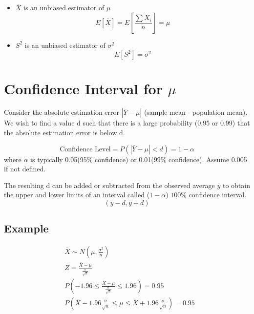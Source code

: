 \documentclass{article}
\begin{document}
    \begin{itemize}
        \item $\bar{X}$ is an unbiased estimator of $\mu$
            \begin{equation*}
                E[\bar{X}] = E[\frac{\sum{X_{i}}}{n}] = \mu
            \end{equation*}
        \item $S^{2}$ is an unbiased estimator of $\sigma^{2}$
        \begin{equation*}
            E[S^{2}]  = \sigma^{2}
        \end{equation*}
    \end{itemize}

    \section*{Confidence Interval for $\mu$}
    Consider the absolute estimation error $|\bar{Y} - \mu|$ (sample mean - population mean). 
    We wish to find a value d such that there is a large probability (0.95 or 0.99) that the absolute estimation 
    error is below d.

    \begin{equation*}
        \text{Confidence Level} = P(|\bar{Y} - \mu| < d) = 1 - \alpha
    \end{equation*}
    where $\alpha$ is typically 0.05(95$\%$ confidence) or 0.01($99\%$ confidence). Assume 0.005 if not defined. \par

    The resulting d can be added or subtracted from the observed average $\bar{y}$ to obtain 
    the upper and lower limits of an interval called ($1-\alpha$) $100\%$ confidence interval.
    \begin{equation*}
        (\bar{y} - d, \bar{y} + d)
    \end{equation*}

    \subsection*{Example}
    \begin{align*}
        &\bar{X} \sim N(\mu, \frac{\sigma^{2}}{n})\\
        &Z = \frac{\bar{X} - \mu}{\frac{\sigma}{\sqrt{n}}}\\
        &P(-1.96 \leq \frac{\bar{X} - \mu}{\frac{\sigma}{\sqrt{n}}} \leq 1.96) = 0.95\\
        &P(\bar{X} - 1.96\frac{\sigma}{\sqrt{n}} \leq \mu \leq \bar{X} + 1.96\frac{\sigma}{\sqrt{n}}) = 0.95
    \end{align*}
\end{document}
